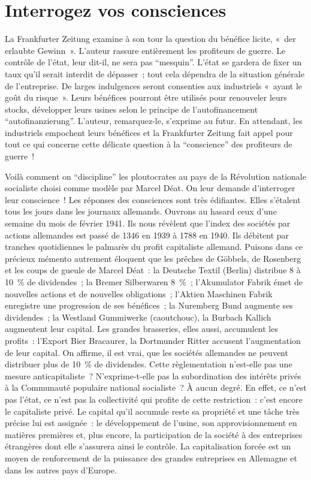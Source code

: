 \documentclass[french,twoside]{book} %
\begin{document}
\section[Interrogez vos consciences]{Interrogez vos consciences}
\noindent La Frankfurter Zeitung examine à son tour la question du bénéfice licite, « der erlaubte Gewinn ». L’auteur rassure entièrement les profiteurs de guerre. Le contrôle de l’état, leur dit-il, ne sera pas “mesquin”. L’état se gardera de fixer un taux qu’il serait interdit de dépasser ; tout cela dépendra de la situation générale de l’entreprise. De larges indulgences seront consenties aux industriels « ayant le goût du risque ». Leurs bénéfices pourront être utilisés pour renouveler leurs stocks, développer leurs usines selon le principe de l’autofinancement “autofinanzierung”. L’auteur, remarquez-le, s’exprime au futur. En attendant, les industriels empochent leurs bénéfices et la Frankfurter Zeitung fait appel pour tout ce qui concerne cette délicate question à la “conscience” des profiteurs de guerre !\par
Voilà comment on “discipline” les ploutocrates au pays de la Révolution nationale socialiste choisi comme modèle par Marcel Déat. On leur demande d’interroger leur conscience ! Les réponses des consciences sont très édifiantes. Elles s’étalent tous les jours dans les journaux allemands. Ouvrons au hasard ceux d’une semaine du mois de février 1941. Ils nous révèlent que l’index des sociétés par actions allemandes est passé de 1346 en 1939 à 1788 en 1940. Ils débitent par tranches quotidiennes le palmarès du profit capitaliste allemand. Puisons dans ce précieux mémento autrement éloquent que les prêches de Göbbels, de Rosenberg et les coups de gueule de Marcel Déat : la Deutsche Textil (Berlin) distribue 8 à 10 \% de dividendes ; la Bremer Silberwaren 8 \% ; l’Akumulator Fabrik émet de nouvelles actions et de nouvelles obligations ; l’Aktien Maschinen Fabrik enregistre une progression de ses bénéfices ; la Nuremberg Bund augmente ses dividendes ; la Westland Gummiwerke (caoutchouc), la Burbach Kallich augmentent leur capital. Les grandes brasseries, elles aussi, accumulent les profits : l’Export Bier Bracaurer, la Dortmunder Ritter accusent l’augmentation de leur capital. On affirme, il est vrai, que les sociétés allemandes ne peuvent distribuer plus de 10 \% de dividendes. Cette règlementation n’est-elle pas une mesure anticapitaliste ? N’exprime-t-elle pas la subordination des intérêts privés à la Communauté populaire national socialiste ? À aucun degré. En effet, ce n’est pas l’état, ce n’est pas la collectivité qui profite de cette restriction : c’est encore le capitaliste privé. Le capital qu’il accumule reste sa propriété et une tâche très précise lui est assignée : le développement de l’usine, son approvisionnement en matières premières et, plus encore, la participation de la société à des entreprises étrangères dont elle s’assurera ainsi le contrôle. La capitalisation forcée est un moyen de renforcement de la puissance des grandes entreprises en Allemagne et dans les autres pays d’Europe.
\end{document}
